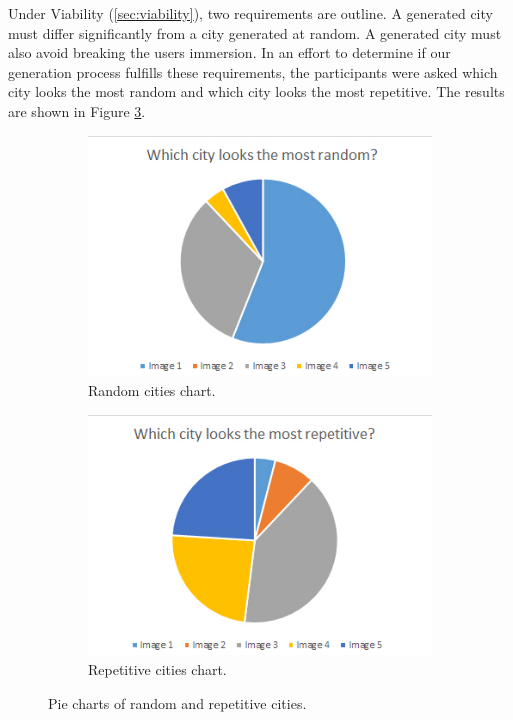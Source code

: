 	Under Viability (\ref{sec:viability}), two requirements are outline. A generated city must differ significantly from a city generated at random. A generated city must also avoid breaking the users immersion. In an effort to determine if our generation process fulfills these requirements, the participants were asked which city looks the most random and which city looks the most repetitive. The results are shown in Figure \ref{fig:pie-chart-random-repetitive}.
	
	\begin{figure}[h]
		\begin{subfigure}{0.5\textwidth}
			\centering
			\includegraphics[width=0.95\linewidth]{"Images/Random"}
			\caption{Random cities chart.}
			\label{fig:pie-chart-random}
		\end{subfigure}
		\begin{subfigure}{0.5\textwidth}
			\centering
			\includegraphics[width=0.95\linewidth]{"Images/Repetitive"}
			\caption{Repetitive cities chart.}
			\label{fig:pie-chart-repetitive}
		\end{subfigure}
		\caption{Pie charts of random and repetitive cities.}
		\label{fig:pie-chart-random-repetitive}
	\end{figure}
	
